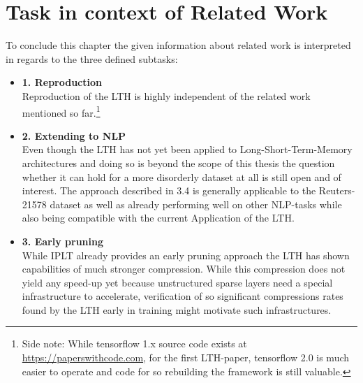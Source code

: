 \section{Task in context of Related Work}
To conclude this chapter the given information about related work is interpreted in regards to the three defined subtasks: 
\begin{itemize}
	\item \textbf{1. Reproduction}\\
	Reproduction of the LTH is highly independent of the related work mentioned so far.\footnote{Side note: While tensorflow 1.x source code exists at \href{https://paperswithcode.com}{https://paperswithcode.com}, for the first LTH-paper, tensorflow 2.0 is much easier to operate and code for so rebuilding the framework is still valuable.}\\ 
	\item \textbf{2. Extending to NLP}\\
	Even though the LTH has not yet been applied to Long-Short-Term-Memory architectures and doing so is beyond the scope of this thesis the question whether it can hold for a more disorderly dataset at all is still open and of interest. The approach described in 3.4 is generally applicable to the Reuters-21578 dataset as well as already performing well on other NLP-tasks while also being compatible with the current Application of the LTH.\\ 
	\item \textbf{3. Early pruning}\\
	While IPLT \cite{Pruning-With-Little-Training} already provides an early pruning approach the LTH has shown capabilities of much stronger compression. While this compression does not yield any speed-up yet because unstructured sparse layers need a special infrastructure to accelerate, verification of so significant compressions rates found by the LTH early in training might motivate such infrastructures.\\
\end{itemize} 
